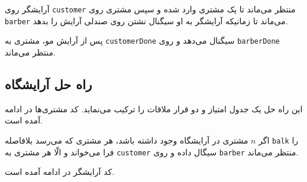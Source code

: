 \documentclass{book}
\newcommand{\clearemptydoublepage}{\newpage\cleardoublepage}
\begin{document}
    آرایشگر روی {\tt customer} منتظر می‌ماند تا یک مشتری وارد شده و سپس مشتری روی  {\tt barber} می‌ماند تا زمانیکه آرایشگر 
    به او سیگنال نشتن روی صندلی آرایش را بدهد. 

    پس از آرایش مو، مشتری به  {\tt customerDone}  سیگنال می‌دهد و روی {\tt barberDone} منتظر می‌ماند. 

\clearemptydoublepage
\subsection{راه حل آرایشگاه}

    این راه حل یک جدول امتیاز و دو قرار ملاقات را ترکیب می‌نماید. کد مشتری‌ها در ادامه آمده است. 

\begin{latin}
%

\end{latin}

    اگر  $n$ مشتری در آرایشگاه وجود داشته باشد، هر مشتری که می‌رسد بلافاصله {\tt balk} را فرا می‌خواند و الّا هر مشتری به {\tt customer}
    سیگال داده و روی {\tt barber} منتظر می‌ماند. 

    کد آرایشگر در ادامه آمده است. 

\begin{latin}
%

\end{latin}
\end{document}
